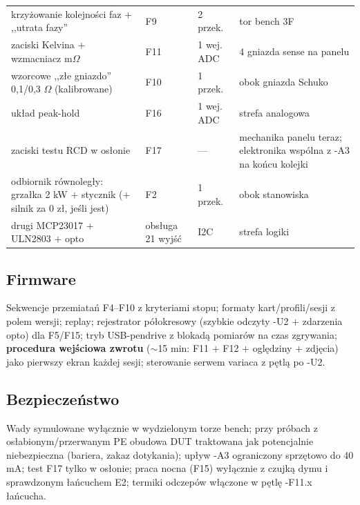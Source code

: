 \documentclass[11pt,a4paper]{article}
\newcommand{\ohm}{$\Omega$}
\begin{document}
\begin{longtable}{@{}p{}p{}p{}p{}@{}}
krzyżowanie kolejności faz $+$ ,,utrata fazy'' & F9 & 2 przek. & tor bench 3F\\
zaciski Kelvina $+$ wzmacniacz m\ohm & F11 & 1 wej. ADC & 4 gniazda sense na panelu\\
wzorcowe ,,złe gniazdo'' 0,1/0,3 \ohm{} (kalibrowane) & F10 & 1 przek. & obok gniazda Schuko\\
układ peak-hold & F16 & 1 wej. ADC & strefa analogowa\\
zaciski testu RCD w osłonie & F17 & --- & mechanika panelu teraz; elektronika wspólna z -A3
na końcu kolejki\\
odbiornik równoległy: grzałka 2 kW $+$ stycznik ($+$silnik za 0 zł, jeśli jest) & F2 & 1 przek. &
obok stanowiska\\
drugi MCP23017 $+$ ULN2803 $+$ opto & obsługa 21 wyjść & I2C & strefa logiki\\
\bottomrule
\end{longtable}
\subsection{Firmware}
Sekwencje przemiatań F4--F10 z kryteriami stopu; formaty kart/profili/sesji z polem wersji;
replay; rejestrator półokresowy (szybkie odczyty -U2 $+$ zdarzenia opto) dla F5/F15; tryb
USB-pendrive z blokadą pomiarów na czas zgrywania; \textbf{procedura wejściowa zwrotu}
($\sim$15 min: F11 $+$ F12 $+$ oględziny $+$ zdjęcia) jako pierwszy ekran każdej sesji;
sterowanie serwem variaca z pętlą po -U2.
\subsection{Bezpieczeństwo}
Wady symulowane wyłącznie w wydzielonym torze bench; przy próbach z osłabionym/przerwanym PE
obudowa DUT traktowana jak potencjalnie niebezpieczna (bariera, zakaz dotykania); upływ -A3
ograniczony sprzętowo do 40 mA; test F17 tylko w osłonie; praca nocna (F15) wyłącznie z czujką
dymu i sprawdzonym łańcuchem E2; termiki odczepów włączone w pętlę -F11.x łańcucha.
\end{document}
